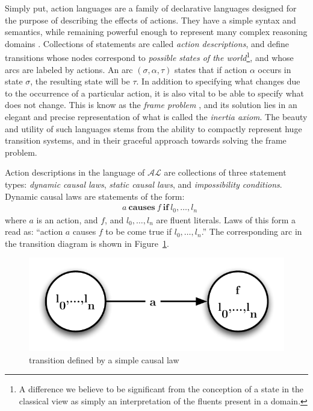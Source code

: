 \documentclass{article}
\newcommand{\triple}[3]{\ensuremath{(#1, #2, #3)}}
\newcommand{\AL}{\ensuremath{\mathcal{AL}}}
\newcommand{\dynamiclawp}[3]{\ensuremath{#1 \: \mathbf{causes} \: #2 \: \mathbf{if} \: #3}}
\begin{document}
Simply put, action languages are a family of declarative languages designed for the purpose of describing the effects of actions. They have a simple syntax and semantics, while remaining powerful enough to represent many complex reasoning domains \cite{Bald2005}. Collections of statements are called \emph{action descriptions}, and define transitions whose nodes correspond to \emph{possible states of the world}\footnote{A difference we believe to be significant from the conception of a state in the classical view as simply an interpretation of the fluents present in a domain.}, and whose arcs are labeled by actions. An arc $\triple{\sigma}{\alpha}{\tau}$ states that if action $\alpha$ occurs in state $\sigma$, the resulting state will be $\tau$. In addition to specifying what changes due to the occurrence of a particular action, it is also vital to be able to specify what does not change. This is know as the \emph{frame problem} \cite{Shan97}, and its solution lies in an elegant and precise representation of what is called the \emph{inertia axiom}. The beauty and utility of such languages stems from the ability to compactly represent huge transition systems, and in their graceful approach towards solving the frame problem.

Action descriptions in the language of $\AL$ are collections of three statement types: \emph{dynamic causal laws}, \emph{static causal laws}, and \emph{impossibility conditions}. Dynamic causal laws are statements of the form:
\begin{align*}
    &\dynamiclawp{a}{f}{l_{0},\ldots,l_{n}}
\end{align*}
where $a$ is an action, and $f$, and $l_{0},\ldots,l_{n}$ are fluent literals. Laws of this form a read as: ``action $a$ causes $f$ to be come true if $l_{0},\ldots,l_{n}$.'' The corresponding arc in the transition diagram is shown in Figure~\ref{fig-dcl}.
\begin{figure}[htb]
    \centering
    \includegraphics[scale=0.5]{dynamic-law}
    \caption{transition defined by a simple causal law}
    \label{fig-dcl}
\end{figure}
\end{document}

